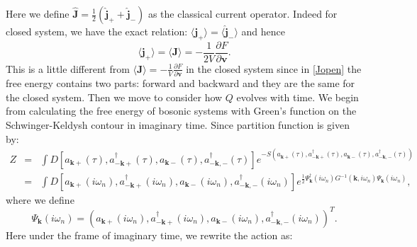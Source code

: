\documentclass{article}
\newcommand{\tmmathbf}[1]{\ensuremath{\boldsymbol{#1}}}
\begin{document}
Here we define $\hat{\tmmathbf{J}} = \frac{1}{2} (\hat{\tmmathbf{j}}_+ +
\hat{\tmmathbf{j}}_-)$ as the classical current operator. Indeed for closed
system, we have the exact relation: $\langle \tmmathbf{j}_+ \rangle = \langle
\hat{\tmmathbf{j}}_- \rangle$ and hence
\begin{equation}
  \langle \tmmathbf{j}_+ \rangle = \langle \tmmathbf{J} \rangle = - \frac{1}{2
  V} \frac{\partial F}{\partial \tmmathbf{v}} . \label{Jopen}
\end{equation}
This is a little different from $\langle \tmmathbf{J} \rangle = - \frac{1}{V}
\frac{\partial F}{\partial \tmmathbf{v}}$ in the closed system since in
\eqref{Jopen} the free energy contains two parts: forward and backward and
they are the same for the closed system. Then we move to consider how $Q$
evolves with time. We begin from calculating the free energy of bosonic
systems with Green's function on the Schwinger-Keldysh contour in imaginary
time. Since partition function is given by:
\begin{eqnarray}
  Z & = & \int D [a_{\tmmathbf{k}+} (\tau), a^{\dagger}_{-\tmmathbf{k}+}
  (\tau), a_{\tmmathbf{k}-} (\tau), a^{\dagger}_{-\tmmathbf{k}, -} (\tau)]
  e^{- S (a_{\tmmathbf{k}+} (\tau), a^{\dagger}_{-\tmmathbf{k}+} (\tau),
  a_{\tmmathbf{k}-} (\tau), a^{\dagger}_{-\tmmathbf{k}, -} (\tau))}
  \nonumber\\
  & = & \int D [a_{\tmmathbf{k}+} (i \omega_n), a^{\dagger}_{-\tmmathbf{k}+}
  (i \omega_n), a_{\tmmathbf{k}-} (i \omega_n), a^{\dagger}_{-\tmmathbf{k}, -}
  (i \omega_n)] e^{\frac{1}{2} \Psi_{\tmmathbf{k}}^{\dagger} (i \omega_n) G^{-
  1} (\tmmathbf{k}, i \omega_n) \Psi_{\tmmathbf{k}} (i \omega_n)}, 
\end{eqnarray}
where we define
\begin{equation}
  \Psi_{\tmmathbf{k}} (i \omega_n) = (a_{\tmmathbf{k}+} (i \omega_n),
  a^{\dagger}_{-\tmmathbf{k}+} (i \omega_n), a_{\tmmathbf{k}-} (i \omega_n),
  a^{\dagger}_{-\tmmathbf{k}, -} (i \omega_n))^T .
\end{equation}
Here under the frame of imaginary time, we rewrite the action as:
\end{document}
